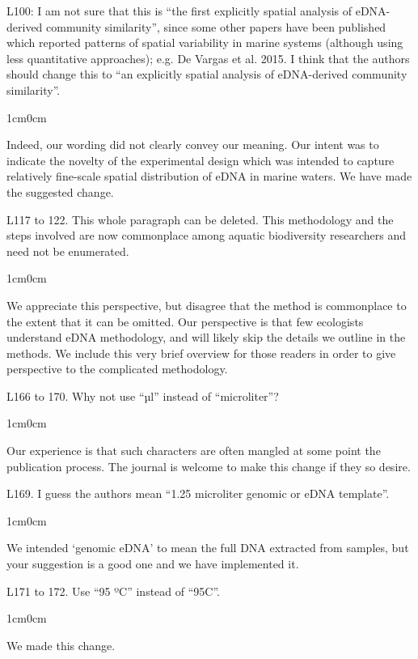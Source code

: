 \documentclass{article}
\newenvironment{response}
	{
	\begin{adjustwidth}{1cm}{0cm}
	\color{peerjBlue}
	}
	{
	\end{adjustwidth}
	}
\begin{document}
L100: I am not sure that this is ``the first explicitly spatial analysis of eDNA-derived community similarity'', since some other papers have been published which reported patterns of spatial variability in marine systems (although using less quantitative approaches); e.g. De Vargas et al. 2015. I think that the authors should change this to ``an explicitly spatial analysis of eDNA-derived community similarity''.
\begin{response}
  Indeed, our wording did not clearly convey our meaning. Our intent was to indicate the novelty of the experimental design which was intended to capture relatively fine-scale spatial distribution of eDNA in marine waters. We have made the suggested change.\\
\end{response}

L117 to 122. This whole paragraph can be deleted. This methodology and the steps involved are now commonplace among aquatic biodiversity researchers and need not be enumerated.
\begin{response}
  We appreciate this perspective, but disagree that the method is commonplace to the extent that it can be omitted. Our perspective is that few ecologists understand eDNA methodology, and will likely skip the details we outline in the methods.
	We include this very brief overview for those readers in order to give perspective to the complicated methodology.\\
\end{response}

L166 to 170. Why not use ``µl'' instead of ``microliter''?
\begin{response}
  Our experience is that such characters are often mangled at some point the publication process. The journal is welcome to make this change if they so desire.\\
\end{response}

L169. I guess the authors mean ``1.25 microliter genomic or eDNA template''.
\begin{response}
  We intended `genomic eDNA' to mean the full DNA extracted from samples, but your suggestion is a good one and we have implemented it.\\
\end{response}

L171 to 172. Use ``95 ºC'' instead of ``95C''.
\begin{response}
  We made this change.\\
\end{response}
\end{document}
